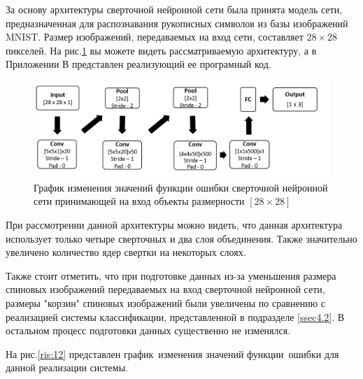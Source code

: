 \documentclass[14pt]{article}
\numberwithin{figure}{section}
\numberwithin{equation}{section}
\begin{document}
За основу архитектуры сверточной нейронной сети была принята модель сети, предназначенная для распознавания рукописных символов из базы изображений MNIST. Размер изображений, передаваемых на вход сети, составляет $28 \times 28$ пикселей. На рис.\ref{ris:11} вы можете видеть рассматриваемую архитектуру, а в Приложении В представлен реализующий ее програмный код.

\begin{figure}[h]
   \begin{center}
       \includegraphics[scale=0.7] {11.JPG}
       \caption{График изменения значений функции ошибки сверточной нейронной сети принимающей на вход объекты размерности $[28 \times 28]$}
       \label{ris:11}
   \end{center}
\end{figure}

При рассмотрении данной архитектуры можно видеть, что данная архитектура использует только четыре сверточных и два слоя объединения. Также значительно увеличено количество ядер свертки на некоторых слоях.

Также стоит отметить, что при подготовке данных из-за уменьшения размера спиновых изображений передаваемых на вход сверточной нейронной сети, размеры "корзин" спиновых изображений были увеличены по сравнению с реализацией системы классификации, представленной в подразделе \ref{ssec4.2}. В остальном процесс подготовки данных существенно не изменялся.

На рис.\ref{ris:12} представлен график изменения значений функции ошибки для данной реализации системы.
\end{document}
